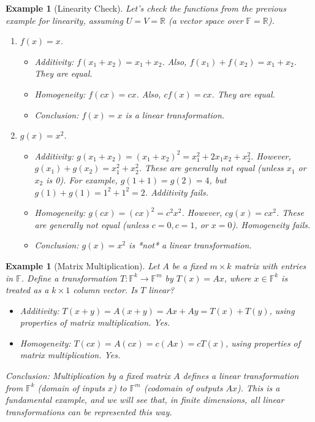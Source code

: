 \documentclass[11pt, letterpaper]{article}
\theoremstyle{mytheoremstyle}
\theoremstyle{mydefinitionstyle}
\newtheorem{example}[theorem]{Example}
\theoremstyle{myremarkstyle}
\newcommand{\F}{\mathbb{F}}
\newcommand{\R}{\mathbb{R}}
\begin{document}
\begin{example}[Linearity Check]
Let's check the functions from the previous example for linearity, assuming $U=V=\R$ (a vector space over $\F=\R$).
\begin{enumerate}
    \item $f(x) = x$.
        \begin{itemize}
            \item Additivity: $f(x_1 + x_2) = x_1 + x_2$. Also, $f(x_1) + f(x_2) = x_1 + x_2$. They are equal.
            \item Homogeneity: $f(cx) = cx$. Also, $c f(x) = c x$. They are equal.
            \item Conclusion: $f(x)=x$ is a linear transformation.
        \end{itemize}
    \item $g(x) = x^2$.
        \begin{itemize}
            \item Additivity: $g(x_1 + x_2) = (x_1 + x_2)^2 = x_1^2 + 2x_1x_2 + x_2^2$. However, $g(x_1) + g(x_2) = x_1^2 + x_2^2$. These are generally not equal (unless $x_1$ or $x_2$ is 0). For example, $g(1+1) = g(2) = 4$, but $g(1)+g(1) = 1^2+1^2 = 2$. Additivity fails.
            \item Homogeneity: $g(cx) = (cx)^2 = c^2 x^2$. However, $c g(x) = c x^2$. These are generally not equal (unless $c=0, c=1$, or $x=0$). Homogeneity fails.
            \item Conclusion: $g(x)=x^2$ is *not* a linear transformation.
        \end{itemize}
\end{enumerate}
\end{example}

\begin{example}[Matrix Multiplication]
Let $A$ be a fixed $m \times k$ matrix with entries in $\F$. Define a transformation $T: \F^k \to \F^m$ by $T(x) = Ax$, where $x \in \F^k$ is treated as a $k \times 1$ column vector. Is $T$ linear?
\begin{itemize}
    \item Additivity: $T(x+y) = A(x+y) = Ax + Ay = T(x) + T(y)$, using properties of matrix multiplication. Yes.
    \item Homogeneity: $T(cx) = A(cx) = c(Ax) = c T(x)$, using properties of matrix multiplication. Yes.
\end{itemize}
Conclusion: Multiplication by a fixed matrix $A$ defines a linear transformation from $\F^k$ (domain of inputs $x$) to $\F^m$ (codomain of outputs $Ax$). This is a fundamental example, and we will see that, in finite dimensions, all linear transformations can be represented this way.
\end{example}
\end{document}

